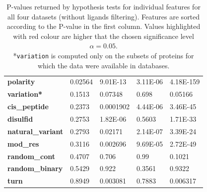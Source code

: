 \begin{table}[]
\begin{tabular}{lllll}
\textbf{polarity}             & 0.02564                        & 9.01E-13                        & 3.11E-06                       & 4.18E-159                       \\
\textbf{variation*}            & \cellcolor[HTML]{F54D4D}0.1513 & \cellcolor[HTML]{F54D4D}0.07348 & \cellcolor[HTML]{F54D4D}0.698  & \cellcolor[HTML]{F54D4D}0.05166 \\
\textbf{cis\_peptide}         & \cellcolor[HTML]{F54D4D}0.2373 & 0.0001902                       & 4.44E-06                       & 3.46E-45                        \\
\textbf{disulfid}             & \cellcolor[HTML]{F54D4D}0.2753 & 1.82E-06                        & \cellcolor[HTML]{F54D4D}0.5603 & 1.71E-33                        \\
\textbf{natural\_variant}     & \cellcolor[HTML]{F54D4D}0.2793 & 0.02171                         & 2.14E-07                       & 3.39E-24                        \\
\textbf{mod\_res}             & \cellcolor[HTML]{F54D4D}0.3116 & 0.002696                        & 9.69E-05                       & 2.72E-49                        \\
\textbf{random\_cont}         & \cellcolor[HTML]{F54D4D}0.4707 & \cellcolor[HTML]{F54D4D}0.706   & \cellcolor[HTML]{F54D4D}0.99   & \cellcolor[HTML]{F54D4D}0.1021  \\
\textbf{random\_binary}       & \cellcolor[HTML]{F54D4D}0.5429 & \cellcolor[HTML]{F54D4D}0.922   & \cellcolor[HTML]{F54D4D}0.3561 & \cellcolor[HTML]{F54D4D}0.9322  \\
\textbf{turn}                 & \cellcolor[HTML]{F54D4D}0.8949 & 0.003081                        & \cellcolor[HTML]{F54D4D}0.7883 & 0.006317                        \\ \hline
\end{tabular}
\caption{P-values returned by hypothesis tests for individual features for all four datasets (without ligands filtering). Features are sorted according to the P-value in the first column. Values highlighted with red colour are higher that the chosen significance level $\alpha = 0.05$.\\\hspace{\textwidth}
*\texttt{variation} is computed only on the subsets of proteins for which the data were available in databases.}
\label{tab:pvaluesAll}
\end{table}


